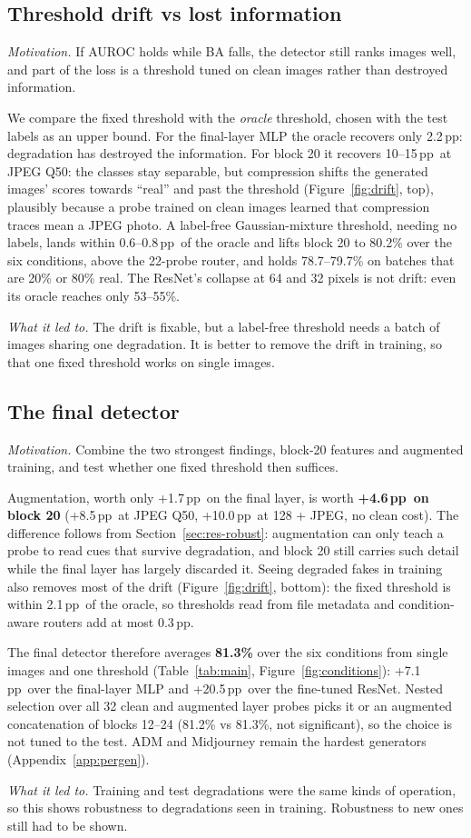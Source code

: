 \documentclass[10pt,a4paper]{article}
\newcommand{\pp}{\,pp}
\newcommand{\why}[1]{\noindent\textit{\color{ntublue}Motivation.} #1\par}
\newcommand{\ledto}[1]{\par\noindent\textit{\color{ntublue}What it led to.} #1\par}
\begin{document}
\subsection{Threshold drift vs lost information}\label{sec:res-threshold}
\why{If AUROC holds while BA falls, the detector still ranks images well, and part of the loss is a threshold tuned on clean images rather than destroyed information.}
We compare the fixed threshold with the \emph{oracle} threshold, chosen with the test labels as an upper bound. For the final-layer MLP the oracle recovers only 2.2\pp: degradation has destroyed the information. For block 20 it recovers 10--15\pp\ at JPEG Q50: the classes stay separable, but compression shifts the generated images' scores towards ``real'' and past the threshold (Figure~\ref{fig:drift}, top), plausibly because a probe trained on clean images learned that compression traces mean a JPEG photo. A label-free Gaussian-mixture threshold, needing no labels, lands within 0.6--0.8\pp\ of the oracle and lifts block 20 to 80.2\% over the six conditions, above the 22-probe router, and holds 78.7--79.7\% on batches that are 20\% or 80\% real. The ResNet's collapse at 64 and 32 pixels is not drift: even its oracle reaches only 53--55\%.
\ledto{The drift is fixable, but a label-free threshold needs a batch of images sharing one degradation. It is better to remove the drift in training, so that one fixed threshold works on single images.}

\subsection{The final detector}\label{sec:res-final}
\why{Combine the two strongest findings, block-20 features and augmented training, and test whether one fixed threshold then suffices.}
Augmentation, worth only +1.7\pp\ on the final layer, is worth \textbf{+4.6\pp\ on block 20} (+8.5\pp\ at JPEG Q50, +10.0\pp\ at 128 + JPEG, no clean cost). The difference follows from Section~\ref{sec:res-robust}: augmentation can only teach a probe to read cues that survive degradation, and block 20 still carries such detail while the final layer has largely discarded it. Seeing degraded fakes in training also removes most of the drift (Figure~\ref{fig:drift}, bottom): the fixed threshold is within 2.1\pp\ of the oracle, so thresholds read from file metadata and condition-aware routers add at most 0.3\pp.

The final detector therefore averages \textbf{81.3\%} over the six conditions from single images and one threshold (Table~\ref{tab:main}, Figure~\ref{fig:conditions}): +7.1\pp\ over the final-layer MLP and +20.5\pp\ over the fine-tuned ResNet. Nested selection over all 32 clean and augmented layer probes picks it or an augmented concatenation of blocks 12--24 (81.2\% vs 81.3\%, not significant), so the choice is not tuned to the test. ADM and Midjourney remain the hardest generators (Appendix~\ref{app:pergen}).
\ledto{Training and test degradations were the same kinds of operation, so this shows robustness to degradations seen in training. Robustness to new ones still had to be shown.}
\end{document}
